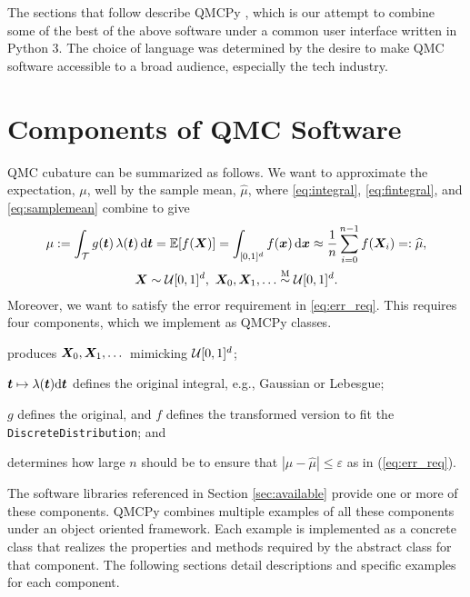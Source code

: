 \documentclass[graybox,footinfo]{svmult}
\newcommand{\QMCPYabs}[1]{\ensuremath{{\left \lvert #1 \right \rvert}}}
\newcommand{\hmu}{\widehat{\mu}}
\newcommand{\Msim}{\overset{\textup{M}}{\sim}}
\newcommand{\cube}{[0,1]^d}
\begin{document}
The sections that follow describe QMCPy \cite{QMCPy2020a}, which is our attempt to combine some of the best of the above software under a common user interface written in Python 3.  The choice of language was determined by the desire to make QMC software accessible to a broad audience, especially the tech industry.

\section{Components of QMC Software}
QMC cubature can be summarized as follows.  We want to approximate the expectation, $\mu$, well by the sample mean, $\hmu$, where \eqref{eq:integral}, \eqref{eq:fintegral}, and \eqref{eq:samplemean} combine to give
\begin{multline} \label{eq:cubSummary}
	\mu : = \int_\calT g(\bst) \, \lambda(\bst) \, \D \bst  = \bbE[f(\bsX)] = \int_{\cube} f(\bsx) \, \D \bsx \approx \frac 1n \sum_{i=0}^{n-1} f(\bsX_i) =: \hmu, \\
	 \bsX \sim \calU\cube, \ \bsX_0, \bsX_1, \ldots \Msim \calU\cube.
\end{multline}
Moreover, we want to satisfy the error requirement in \eqref{eq:err_req}.
This requires four components, which we implement as QMCPy classes.

\begin{description}[format=\textup,format=\textbf]
	
	\item[Discrete Distribution]  produces ${\boldsymbol{X}}_0, {\boldsymbol{X}}_1, \dots$ mimicking ${\mathcal{U}}[0,1]^d$;
	
	\item[True Measure] ${\boldsymbol{t}} \mapsto \lambda ({\boldsymbol{t}}) \mathrm{d} {\boldsymbol{t}}$  defines the original integral, e.g., Gaussian or Lebesgue;
	
	\item[Integrand] $g$  defines the original, and $f$ defines the transformed version to fit the \texttt{DiscreteDistribution}; and
	
	\item[Stopping Criterion] determines how large $n$ should be to ensure that $\QMCPYabs{\mu - \hmu} \le \varepsilon$ as in (\ref{eq:err_req}).
\end{description}

The software libraries referenced in Section \ref{sec:available} provide one or more of these components. QMCPy combines multiple examples of all these components under an object oriented framework. Each example is implemented as a concrete class that realizes the properties and methods required by the abstract class for that component. The following sections detail descriptions and specific examples for each component. 
\end{document}
